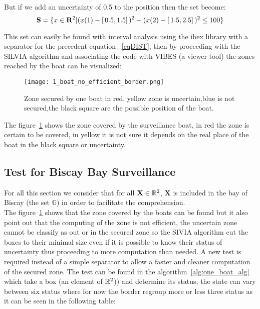 But if we add an uncertainty of 0.5 to the position then the set become:
\begin{equation}
 \mathbf{S} = \{ x \in \mathbf{R}^{\textnormal{\ensuremath{2}}} | (x(1)-[ \,0.5,1.5] \,)^{\textnormal{\ensuremath{2}}} + (x(2)-[ \,1.5,2.5] \,)^{\textnormal{\ensuremath{2}}} \leq 100 \}  \label{eqDISTTHICK}
 \end{equation}

This set can easily be found with interval analysis using the ibex library with a separator for the precedent equation ~\eqref{eqDIST}, then by proceeding with the SILVIA algorithm and associating the code with VIBES (a viewer tool) the zones reached by the boat can be visualized:

\begin{figure}[H]
\centering
    \texttt{[image: 1\_boat\_no\_efficient\_border.png]}
    \caption{Zone secured by one boat in red, yellow zone is uncertain,blue is not secured,the black square are the possible position of the boat.}
    \label{fig:SecureZoneOneBoat}
\end{figure}

The figure~\ref{fig:SecureZoneOneBoat} shows the zone covered by the surveillance boat, in red the zone is certain to be covered, in yellow it is not sure it depends on the real place of the boat in the black square or uncertainty.

\subsection{Test for Biscay Bay Surveillance}
For all this section we consider that for all $\mathbf{X} \in \mathbb{R^{\textnormal{\ensuremath{2}}}}$,  $\mathbf{X}$ is included in the bay of Biscay (the set $\mathbb{G}$) in order to facilitate the comprehension.\\
The figure~\ref{fig:SecureZoneOneBoat} shows that the zone covered by the boats can be found but it also point out that the computing of the zone is not efficient, the uncertain zone cannot be classify as out or in the secured zone so the SIVIA algorithm cut the boxes to their minimal size even if it is possible to know their status of uncertainty thus proceeding to more computation than needed. A new test is required instead of a simple separator to allow a faster and cleaner computation of the secured zone.
The test can be found in the algorithm~\ref{alg:one_boat_alg} which take a box (an element of $\mathbb{R}^{\textnormal{\ensuremath{2}}}$)) and determine its status, the state can vary between six status where for now the border regroup more or less three status as it can be seen in the following table:

